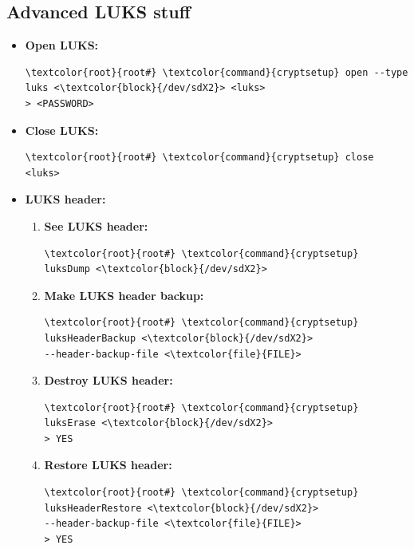 \documentclass[10pt, a4paper, onecolumn, oneside, titlepage, openany]{book}
\begin{document}
    \subsection{Advanced LUKS stuff}
\begin{itemize}
    \item \textbf{Open LUKS:}
\begin{Verbatim}[commandchars=\\\{\}]
\textcolor{root}{root#} \textcolor{command}{cryptsetup} open --type luks <\textcolor{block}{/dev/sdX2}> <luks>
> <PASSWORD>
\end{Verbatim}
    \item \textbf{Close LUKS:}
\begin{Verbatim}[commandchars=\\\{\}]
\textcolor{root}{root#} \textcolor{command}{cryptsetup} close <luks>
\end{Verbatim}
    \item \textbf{LUKS header:}
    \begin{enumerate}
        \item \textbf{See LUKS header:}
\begin{Verbatim}[commandchars=\\\{\}]
\textcolor{root}{root#} \textcolor{command}{cryptsetup} luksDump <\textcolor{block}{/dev/sdX2}>
\end{Verbatim}
        \item \textbf{Make LUKS header backup:}
\begin{Verbatim}[commandchars=\\\{\}]
\textcolor{root}{root#} \textcolor{command}{cryptsetup} luksHeaderBackup <\textcolor{block}{/dev/sdX2}>
--header-backup-file <\textcolor{file}{FILE}>
\end{Verbatim}
        \item \textbf{Destroy LUKS header:}
\begin{Verbatim}[commandchars=\\\{\}]
\textcolor{root}{root#} \textcolor{command}{cryptsetup} luksErase <\textcolor{block}{/dev/sdX2}>
> YES
\end{Verbatim}
        \item \textbf{Restore LUKS header:}
\begin{Verbatim}[commandchars=\\\{\}]
\textcolor{root}{root#} \textcolor{command}{cryptsetup} luksHeaderRestore <\textcolor{block}{/dev/sdX2}>
--header-backup-file <\textcolor{file}{FILE}>
> YES
\end{Verbatim}
    \end{enumerate}
\end{itemize}
\end{document}
